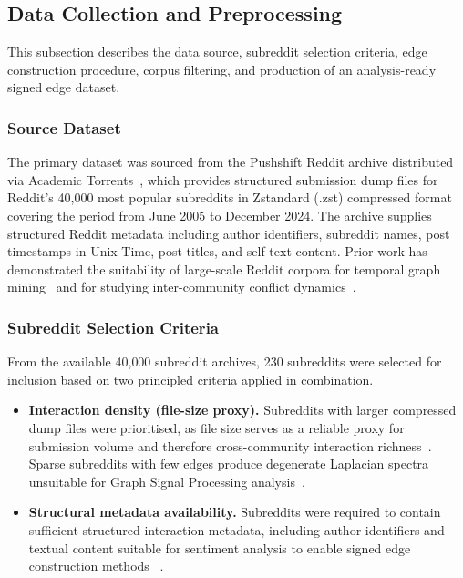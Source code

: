 \documentclass[a4paper,fleqn]{cas-dc}
\begin{document}
\subsection{Data Collection and Preprocessing}
\label{sub_method_data_collection}


This subsection describes the data source, subreddit selection
criteria, edge construction procedure, corpus filtering, and production of an analysis-ready signed edge dataset.



\subsubsection{Source Dataset}
\label{subsub:source}

The primary dataset was sourced from the Pushshift Reddit archive
distributed via Academic Torrents~\cite{20_Watchful2025}, which
provides structured submission dump files for Reddit's 40{,}000 most
popular subreddits in Zstandard (.zst) compressed format covering the
period from June 2005 to December 2024. The archive supplies structured
Reddit metadata including author identifiers, subreddit names, post
timestamps in Unix Time, post titles, and self-text content. Prior
work has demonstrated the suitability of large-scale Reddit corpora for
temporal graph mining~\cite{5_Huber2022} and for studying inter-community
conflict dynamics~\cite{3_Vachher2020,2_Zhu2022}.


\subsubsection{Subreddit Selection Criteria}
\label{subsub:selection}

From the available 40{,}000 subreddit archives, 230 subreddits were
selected for inclusion based on two principled criteria applied in
combination.

\begin{itemize}

  \item \textbf{Interaction density (file-size proxy).}
    Subreddits with larger compressed dump files were prioritised, as
    file size serves as a reliable proxy for submission volume and
    therefore cross-community interaction richness~\cite{5_Huber2022}.
    Sparse subreddits with few edges produce degenerate Laplacian
    spectra unsuitable for Graph Signal Processing
    analysis~\cite{17_Shuman2013}.

  \item \textbf{Structural metadata availability.}
    Subreddits were required to contain sufficient structured
    interaction metadata, including author identifiers and textual
 content suitable for sentiment analysis to enable signed edge
    construction methods ~\cite{19_Hutto2014}.

\end{itemize}
\end{document}
